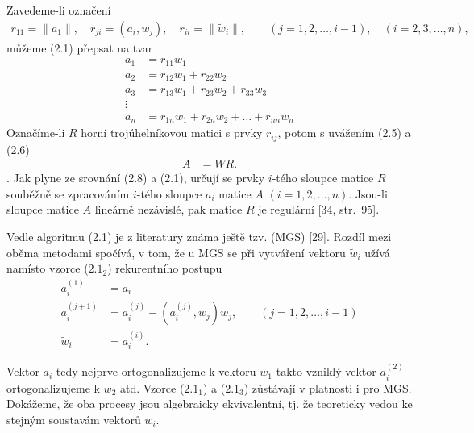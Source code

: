 Zavedeme-li označení 
%
\begin{align*}
   r_{11} = \| a_1 \|, \quad r_{ji} = (a_i, w_j),
           \quad r_{ii} = \| \widetilde w_i \|, \qquad          \tag{2.8}
           (j = 1, 2, \ldots, i-1), \quad (i = 2, 3, \ldots, n),
\end{align*}
%
můžeme (2.1) přepsat na tvar
%
\begin{align*}
   a_1 &= r_{11} w_1                                            \tag{2.9}\\
   a_2 &= r_{12} w_1 + r_{22} w_2\\
   a_3 &= r_{13} w_1 + r_{23} w_2 + r_{33} w_3\\
   \vdots\\
   a_n &= r_{1n} w_1 + r_{2n} w_2 + \ldots + r_{nn} w_n
\end{align*}
%
Označíme-li $R$ horní trojúhelníkovou matici s prvky $r_{ij}$,
potom s uvážením (2.5) a (2.6)
%
\begin{align*}
   A &= WR.         \tag{2.10}
\end{align*}
%
. Jak plyne ze
srovnání (2.8) a (2.1), určují se prvky $i$-tého sloupce matice $R$
souběžně se zpracováním $i$-tého sloupce $a_i$ matice $A$
$(i=1,2,\ldots,n)$.  Jsou-li sloupce matice $A$ lineárně nezávislé,
pak matice $R$ je regulární [34, str.\ 95].


Vedle algoritmu (2.1) je z literatury známa ještě
tzv.  (MGS) [29]. Rozdíl mezi
oběma metodami spočívá, v tom, že u MGS se při vytváření vektoru
$\widetilde w_i$ užívá namísto vzorce ($2.1_2$) rekurentního postupu
%
\begin{align*}
   a_i^{(1)}    & = a_i                                     \tag{$2.11_1$}\\
   a_i^{(j+1)} &= a_i^{(j)} - (a_i^{(j)}, w_j) w_j, \qquad
                 (j = 1, 2, \ldots, i - 1)                 \tag{$2.11_2$}\\
   \widetilde w_i &= a_i^{(i)}.                             \tag{$2.11_3$}
\end{align*}
%


\noindent Vektor $a_i$  tedy nejprve ortogonalizujeme k
vektoru $w_1$ takto vzniklý vektor $a_i^{(2)}$ ortogonalizujeme k
$w_2$ atd. Vzorce ($2.1_1$) a ($2.1_3$) zůstávají v platnosti i pro
MGS. Dokážeme, že oba procesy jsou algebraicky ekvivalentní,
tj. že teoreticky vedou ke stejným soustavám vektorů $w_i$.

